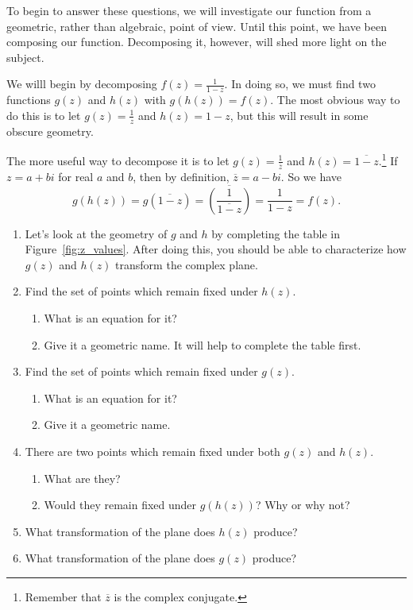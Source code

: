 \documentclass[../gatm.tex]{subfiles}
\begin{document}
To begin to answer these questions, we will investigate our function from a geometric, rather than algebraic, point of view. Until this point, we have been composing our function. Decomposing it, however, will shed more light on the subject.

We willl begin by decomposing $f(z)=\frac{1}{1-z}$. In doing so, we must find two functions $g(z)$ and $h(z)$ with $g(h(z))=f(z)$. The most obvious way to do this is to let $g(z)=\frac{1}{z}$ and $h(z)=1-z$, but this will result in some obscure geometry.

The more useful way to decompose it is to let $g(z)=\frac{1}{\overline{z}}$ and $h(z)=\overline{1-z}$.\footnote{Remember that $\overline{z}$ is the complex conjugate.} If $z=a+bi$ for real $a$ and $b$, then by definition, $\overline{z}=a-bi$. So we have
$$g(h(z))=g(\overline{1-z})=\overline{\left(\frac{1}{\overline{1-z}}\right)}=\frac{1}{1-z}=f(z).$$

\begin{enumerate}
\setcounter{enumi}{\value{problem_i}}
\item Let's look at the geometry of $g$ and $h$ by completing the table in Figure~\ref{fig:z_values}. After doing this, you should be able to characterize how $g(z)$ and $h(z)$ transform the complex plane.
\item Find the set of points which remain fixed under $h(z)$.
\begin{enumerate}
\item What is an equation for it?
\item Give it a geometric name. It will help to complete the table first.
\end{enumerate}
\item Find the set of points which remain fixed under $g(z)$.
\begin{enumerate}
\item What is an equation for it?
\item Give it a geometric name.
\end{enumerate}
\item There are two points which remain fixed under both $g(z)$ and $h(z)$.
\begin{enumerate}
\item What are they?
\item Would they remain fixed under $g(h(z))$? Why or why not?
\end{enumerate}
\item What transformation of the plane does $h(z)$ produce?
\item What transformation of the plane does $g(z)$ produce?
\setcounter{problem_i}{\value{enumi}}
\end{enumerate}
\end{document}
